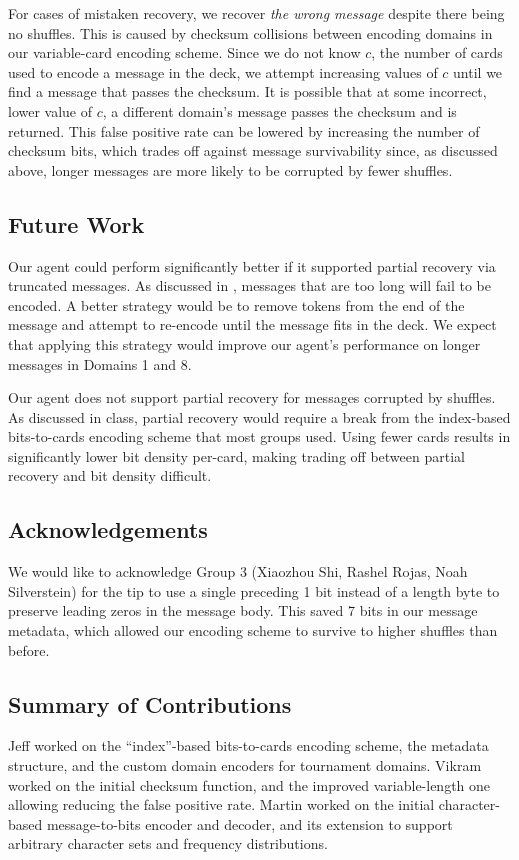 \documentclass[titlepage]{article}
\begin{document}
For cases of mistaken recovery, we recover \textit{the wrong message} despite there being no shuffles. This is caused by checksum collisions between encoding domains in our variable-card encoding scheme. Since we do not know $c$, the number of cards used to encode a message in the deck, we attempt increasing values of $c$ until we find a message that passes the checksum. It is possible that at some incorrect, lower value of $c$, a different domain's message passes the checksum and is returned. This false positive rate can be lowered by increasing the number of checksum bits, which trades off against message survivability since, as discussed above, longer messages are more likely to be corrupted by fewer shuffles.

\subsection{Future Work} \label{future}
Our agent could perform significantly better if it supported partial recovery via truncated messages. As discussed in , messages that are too long will fail to be encoded. A better strategy would be to remove tokens from the end of the message and attempt to re-encode until the message fits in the deck. We expect that applying this strategy would improve our agent's performance on longer messages in Domains 1 and 8.

Our agent does not support partial recovery for messages corrupted by shuffles. As discussed in class, partial recovery would require a break from the index-based bits-to-cards encoding scheme that most groups used. Using fewer cards results in significantly lower bit density per-card, making trading off between partial recovery and bit density difficult.

\subsection{Acknowledgements}
We would like to acknowledge Group 3 (Xiaozhou Shi, Rashel Rojas, Noah Silverstein) for the tip to use a single preceding 1 bit instead of a length byte to preserve leading zeros in the message body. This saved 7 bits in our message metadata, which allowed our encoding scheme to survive to higher shuffles than before.

\subsection{Summary of Contributions}
Jeff worked on the ``index''-based bits-to-cards encoding scheme, the metadata structure, and the custom domain encoders for tournament domains. Vikram worked on the initial checksum function, and the improved variable-length one allowing reducing the false positive rate. Martin worked on the initial character-based message-to-bits encoder and decoder, and its extension to support arbitrary character sets and frequency distributions.
\end{document}
